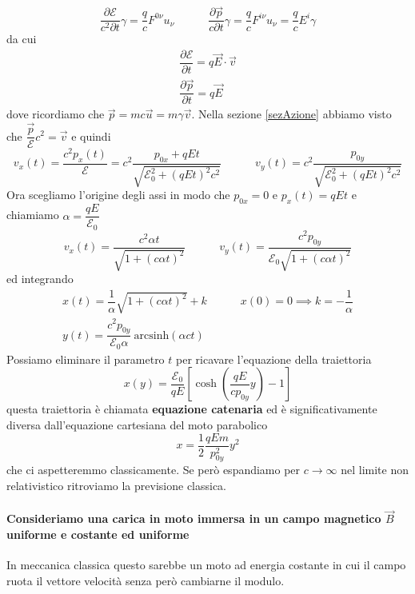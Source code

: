 \documentclass[12pt,a4paper,titlepage, twoside, openright]{book}
\numberwithin{equation}{chapter}
\begin{document}
\[
\dfrac{\partial \mathcal{E}}{c^2 \partial t}\gamma=\dfrac{q}{c}F^{0\nu}u_\nu 
\qquad\quad
\dfrac{\partial \vec{p}}{c\partial t}\gamma=\dfrac{q}{c}F^{i\nu}u_\nu=\dfrac{q}{c}E^i \gamma
\]
da cui
\begin{gather}
\dfrac{\partial \mathcal{E}}{\partial t}=q\vec{E}\cdot\vec{v}\\
\dfrac{\partial \vec{p}}{\partial t}=q\vec{E}
\end{gather}
dove ricordiamo che $\vec{p}=mc\vec{u}=m\gamma\vec{v}$.
Nella sezione \ref{sezAzione} abbiamo visto che $\dfrac{\vec{p}}{\mathcal{E}}c^2=\vec{v}$ e quindi 
\[
v_x(t)=\dfrac{c^2 p_x(t) }{\mathcal{E}}=c^2\dfrac{p_{0x}+qEt}{\sqrt{\mathcal{E}_0^2+(qEt)^2c^2}} \qquad\quad
v_y(t)=c^2\dfrac{p_{0y}}{\sqrt{\mathcal{E}_0^2+(qEt)^2c^2}}
\]
Ora scegliamo l'origine degli assi in modo che $p_{0x}=0$ e $p_{x}(t)=qEt$ e chiamiamo $\alpha=\dfrac{qE}{\mathcal{E}_0}$
\[
v_x(t)=\dfrac{c^2\alpha t}{\sqrt{1+ (c\alpha t)^2}} \qquad\quad
v_y(t)=\dfrac{c^2p_{0y}}{\mathcal{E}_0\sqrt{1+(c\alpha t)^2}}
\]
ed integrando
\begin{gather*}
x(t)=\dfrac{1}{\alpha}\sqrt{1+(c\alpha t)^2}+k \qquad \quad x(0)=0\implies k=-\dfrac{1}{\alpha} \\
y(t)=\dfrac{c^2p_{0y}}{\mathcal{E}_0\alpha}\>\text{arcsinh}{(\alpha c t)}
\end{gather*}
Possiamo eliminare il parametro $t$ per ricavare l'equazione della traiettoria
\begin{equation}
x(y)=\dfrac{\mathcal{E}_0}{qE}\left[\cosh{\left(\dfrac{qE}{cp_{0y}}y\right)}-1\right]
\end{equation}
questa traiettoria è chiamata \textbf{equazione catenaria} ed è significativamente diversa dall'equazione cartesiana del moto parabolico \[x=\dfrac{1}{2}\dfrac{qEm}{p_{0y}^2}y^2\] che ci aspetteremmo classicamente. 
Se però espandiamo per $c\rightarrow \infty$ nel limite non relativistico ritroviamo la previsione classica.

\paragraph{Consideriamo una carica in moto immersa in un campo magnetico $\vec{B}$ uniforme e costante ed uniforme}

In meccanica classica questo sarebbe un moto ad energia costante in cui il campo ruota il vettore velocità senza però cambiarne il modulo.
\end{document}
